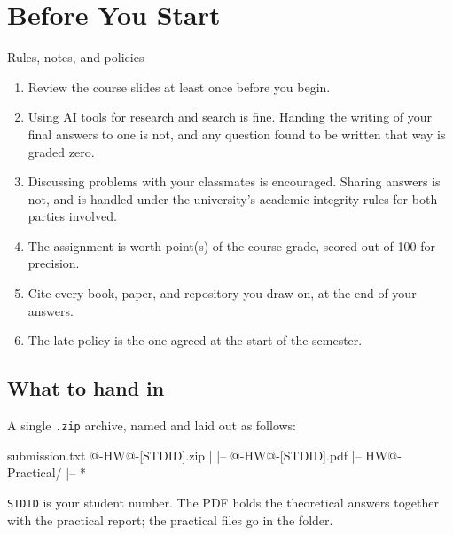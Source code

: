 \section*{Before You Start}

\begin{blockbox}{Rules, notes, and policies}
    \begin{enumerate}
        \item Review the course slides at least once before you begin.

        \item Using AI tools for research and search is fine. Handing the
              writing of your final answers to one is not, and any question
              found to be written that way is graded zero.

        \item Discussing problems with your classmates is encouraged. Sharing
              answers is not, and is handled under the university's academic
              integrity rules for both parties involved.

        \item The assignment is worth \hwgrade{} point(s) of the course grade,
              scored out of 100 for precision.

        \item Cite every book, paper, and repository you draw on, at the end
              of your answers.

        \item The late policy is the one agreed at the start of the semester.
    \end{enumerate}
\end{blockbox}

\subsection*{What to hand in}

A single \texttt{.zip} archive, named and laid out as follows:

\begin{codeblock}{submission.txt}
@\coursecode@-HW@\hwnumber@-[STDID].zip
|
|-- @\coursecode@-HW@\hwnumber@-[STDID].pdf
|-- HW@\hwnumber@-Practical/
        |-- *
\end{codeblock}

\texttt{STDID} is your student number. The PDF holds the theoretical answers
together with the practical report; the practical files go in the folder.

